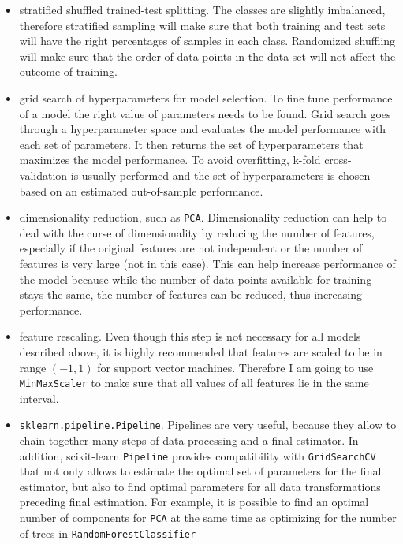 \documentclass[10pt, a4paper]{article}
\begin{document}
\begin{itemize}
	\item stratified shuffled trained-test splitting. The classes are slightly imbalanced, therefore stratified sampling will make sure that both training and test sets will have the right percentages of samples in each class. Randomized shuffling will make sure that the order of data points in the data set will not affect the outcome of training.
	\item grid search of hyperparameters for model selection. To fine tune performance of a model the right value of parameters needs to be found. Grid search goes through a hyperparameter space and evaluates the model performance with each set of parameters. It then returns the set of hyperparameters that maximizes the model performance. To avoid overfitting, k-fold cross-validation is usually performed and the set of hyperparameters is chosen based on an estimated out-of-sample performance.
	\item dimensionality reduction, such as \texttt{PCA}. Dimensionality reduction can help to deal with the curse of dimensionality by reducing the number of features, especially if the original features are not independent or the number of features is very large (not in this case). This can help increase performance of the model because while the number of data points available for training stays the same, the number of features can be reduced, thus increasing performance.
	\item feature rescaling. Even though this step is not necessary for all models described above, it is highly recommended that features are scaled to be in range $(-1,1)$ for support vector machines. Therefore I am going to use \texttt{MinMaxScaler} to make sure that all values of all features lie in the same interval.
	\item \texttt{sklearn.pipeline.Pipeline}. Pipelines are very useful, because they allow to chain together many steps of data processing and a final estimator. In addition, scikit-learn \texttt{Pipeline} provides compatibility with \texttt{GridSearchCV} that not only allows to estimate the optimal set of parameters for the final estimator, but also to find optimal parameters for all data transformations preceding final estimation. For example, it is possible to find an optimal number of components for \texttt{PCA} at the same time as optimizing for the number of trees in \texttt{RandomForestClassifier}
\end{itemize}
\end{document}
